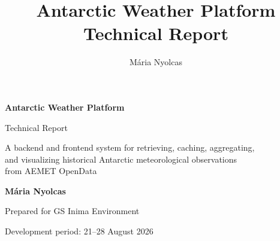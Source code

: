 \documentclass[11pt,a4paper]{article}
\title{\textbf{Antarctic Weather Platform}\\
\large Technical Report}
\author{M\'aria Nyolcas}
\date{}
\begin{document}
\begin{titlepage}
\centering
\vspace*{3cm}

{\Huge\bfseries Antarctic Weather Platform\par}
\vspace{0.5cm}
{\Large Technical Report\par}

\vspace{2cm}

{\large A backend and frontend system for retrieving, caching, aggregating,\\
and visualizing historical Antarctic meteorological observations\\
from AEMET OpenData\par}

\vfill

{\large\bfseries M\'aria Nyolcas\par}
\vspace{0.3cm}
{\large Prepared for GS Inima Environment\par}

\vspace{1.5cm}

{\large Development period: 21--28 August 2026\par}

\vspace{2cm}

\end{titlepage}
\end{document}
